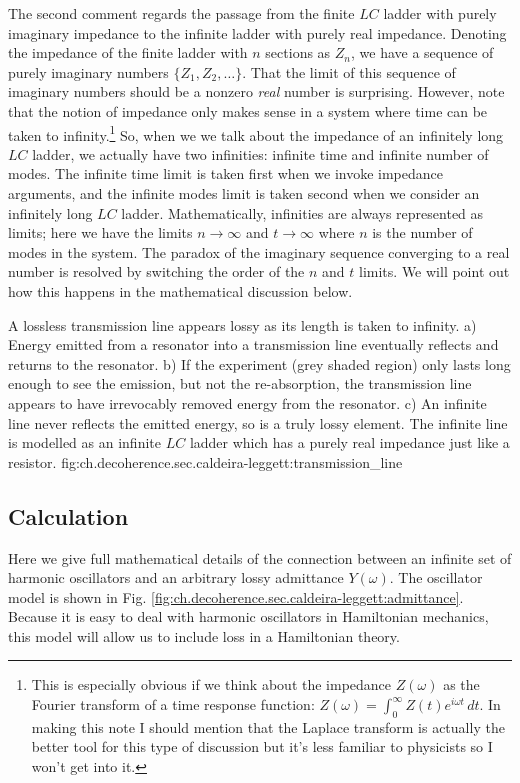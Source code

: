 The second comment regards the passage from the finite $LC$ ladder with purely imaginary impedance to the infinite ladder with purely real impedance.
Denoting the impedance of the finite ladder with $n$ sections as $Z_n$, we have a sequence of purely imaginary numbers $\{ Z_1, Z_2, \ldots \}$.
That the limit of this sequence of imaginary numbers should be a nonzero \emph{real} number is surprising.
However, note that the notion of impedance only makes sense in a system where time can be taken to infinity.\footnote{This is especially obvious if we think about the impedance $Z(\omega)$ as the Fourier transform of a time response function: $Z(\omega) = \int_0^\infty Z(t) e^{i \omega t} \, dt$. In making this note I should mention that the Laplace transform is actually the better tool for this type of discussion but it's less familiar to physicists so I won't get into it.}
So, when we we talk about the impedance of an infinitely long $LC$ ladder, we actually have two infinities: infinite time and infinite number of modes.
The infinite time limit is taken first when we invoke impedance arguments, and the infinite modes limit is taken second when we consider an infinitely long $LC$ ladder.
Mathematically, infinities are always represented as limits; here we have the limits $n\rightarrow \infty$ and $t \rightarrow \infty$ where $n$ is the number of modes in the system.
The paradox of the imaginary sequence converging to a real number is resolved by switching the order of the $n$ and $t$ limits.
We will point out how this happens in the mathematical discussion below.

{A lossless transmission line appears lossy as its length is taken to infinity.
a) Energy emitted from a resonator into a transmission line eventually reflects and returns to the resonator.
b) If the experiment (grey shaded region) only lasts long enough to see the emission, but not the re-absorption, the transmission line appears to have irrevocably removed energy from the resonator.
c) An infinite line never reflects the emitted energy, so is a truly lossy element.
The infinite line is modelled as an infinite $LC$ ladder which has a purely real impedance just like a resistor.
}
{fig:ch.decoherence.sec.caldeira-leggett:transmission_line}


\subsection{Calculation}

Here we give full mathematical details of the connection between an infinite set of harmonic oscillators and an arbitrary lossy admittance $Y(\omega)$.
The oscillator model is shown in Fig. \ref{fig:ch.decoherence.sec.caldeira-leggett:admittance}.
Because it is easy to deal with harmonic oscillators in Hamiltonian mechanics, this model will allow us to include loss in a Hamiltonian theory.

